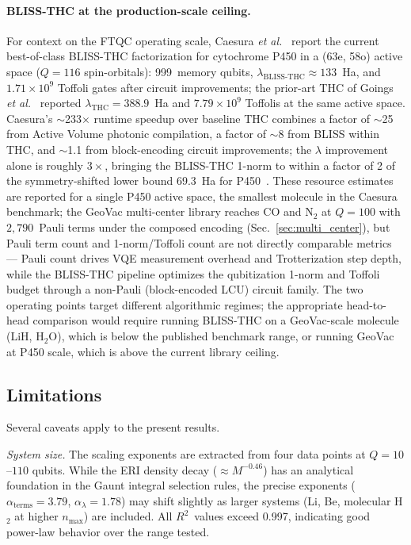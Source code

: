 \documentclass[aps,pra,twocolumn,superscriptaddress,longbibliography]{revtex4-2}
\newcommand{\gvq}[2]{#2}
\begin{document}
\paragraph{BLISS-THC at the production-scale ceiling.}
For context on the FTQC operating scale, Caesura
\textit{et al.}~\cite{caesura2025} report the current best-of-class
BLISS-THC factorization for cytochrome P450 in a (63e, 58o) active
space ($Q = 116$ spin-orbitals): 999~memory qubits,
$\lambda_{\mathrm{BLISS\text{-}THC}} \approx 133$~Ha,
and $1.71 \times 10^9$ Toffoli gates after circuit improvements;
the prior-art THC of Goings \textit{et al.}~\cite{goings2022}
reported $\lambda_{\mathrm{THC}} = 388.9$~Ha and
$7.79 \times 10^9$ Toffolis at the same active space.  Caesura's
$\sim$233$\times$ runtime speedup over baseline THC combines a
factor of $\sim$25 from Active Volume photonic compilation, a
factor of $\sim$8 from BLISS within THC, and $\sim$1.1 from
block-encoding circuit improvements; the $\lambda$ improvement
alone is roughly $3\times$, bringing the BLISS-THC 1-norm to within
a factor of 2 of the symmetry-shifted lower bound 69.3~Ha for
P450~\cite{caesura2025}.  These resource estimates are reported
for a single P450 active space, the smallest molecule in the
Caesura benchmark; the GeoVac multi-center library
reaches CO and N$_2$ at $Q = 100$ with
$2{,}790$~Pauli terms under the composed encoding (Sec.~\ref{sec:multi_center}),
but Pauli term count and 1-norm/Toffoli count are not directly
comparable metrics --- Pauli count drives VQE measurement overhead
and Trotterization step depth, while the BLISS-THC pipeline
optimizes the qubitization 1-norm and Toffoli budget through a
non-Pauli (block-encoded LCU) circuit family.  The two operating
points target different algorithmic regimes; the appropriate
head-to-head comparison would require running BLISS-THC on a
GeoVac-scale molecule (LiH, H$_2$O), which is below the published
benchmark range, or running GeoVac at P450 scale, which is above
the current library ceiling.

\subsection{Limitations}
\label{sec:limitations}

Several caveats apply to the present results.

\emph{System size.}  The scaling exponents are extracted from four data
points at $Q = 10$--$110$ qubits.  While the ERI density decay
($\approx M^{\gvq{eri_decay_4pt}{-0.46}}$) has an analytical foundation
in the Gaunt integral selection rules, the
precise exponents ($\alpha_{\mathrm{terms}} = 3.79$,
$\alpha_{\lambda} = 1.78$) may shift slightly as larger systems (Li, Be,
molecular H$_2$ at higher $n_{\max}$) are included.  All $R^2$~values
exceed 0.997, indicating good power-law behavior over the range tested.
\end{document}
